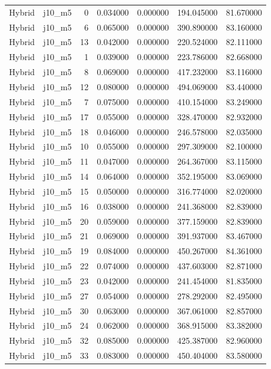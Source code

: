 \begin{tabular}{llrrrrr}
Hybrid & j10_m5 & 0 & 0.034000 & 0.000000 & 194.045000 & 81.670000 \\
Hybrid & j10_m5 & 6 & 0.065000 & 0.000000 & 390.890000 & 83.160000 \\
Hybrid & j10_m5 & 13 & 0.042000 & 0.000000 & 220.524000 & 82.111000 \\
Hybrid & j10_m5 & 1 & 0.039000 & 0.000000 & 223.786000 & 82.668000 \\
Hybrid & j10_m5 & 8 & 0.069000 & 0.000000 & 417.232000 & 83.116000 \\
Hybrid & j10_m5 & 12 & 0.080000 & 0.000000 & 494.069000 & 83.440000 \\
Hybrid & j10_m5 & 7 & 0.075000 & 0.000000 & 410.154000 & 83.249000 \\
Hybrid & j10_m5 & 17 & 0.055000 & 0.000000 & 328.470000 & 82.932000 \\
Hybrid & j10_m5 & 18 & 0.046000 & 0.000000 & 246.578000 & 82.035000 \\
Hybrid & j10_m5 & 10 & 0.055000 & 0.000000 & 297.309000 & 82.100000 \\
Hybrid & j10_m5 & 11 & 0.047000 & 0.000000 & 264.367000 & 83.115000 \\
Hybrid & j10_m5 & 14 & 0.064000 & 0.000000 & 352.195000 & 83.069000 \\
Hybrid & j10_m5 & 15 & 0.050000 & 0.000000 & 316.774000 & 82.020000 \\
Hybrid & j10_m5 & 16 & 0.038000 & 0.000000 & 241.368000 & 82.839000 \\
Hybrid & j10_m5 & 20 & 0.059000 & 0.000000 & 377.159000 & 82.839000 \\
Hybrid & j10_m5 & 21 & 0.069000 & 0.000000 & 391.937000 & 83.467000 \\
Hybrid & j10_m5 & 19 & 0.084000 & 0.000000 & 450.267000 & 84.361000 \\
Hybrid & j10_m5 & 22 & 0.074000 & 0.000000 & 437.603000 & 82.871000 \\
Hybrid & j10_m5 & 23 & 0.042000 & 0.000000 & 241.454000 & 81.835000 \\
Hybrid & j10_m5 & 27 & 0.054000 & 0.000000 & 278.292000 & 82.495000 \\
Hybrid & j10_m5 & 30 & 0.063000 & 0.000000 & 367.061000 & 82.857000 \\
Hybrid & j10_m5 & 24 & 0.062000 & 0.000000 & 368.915000 & 83.382000 \\
Hybrid & j10_m5 & 32 & 0.085000 & 0.000000 & 425.387000 & 82.960000 \\
Hybrid & j10_m5 & 33 & 0.083000 & 0.000000 & 450.404000 & 83.580000 \\

\end{tabular}
